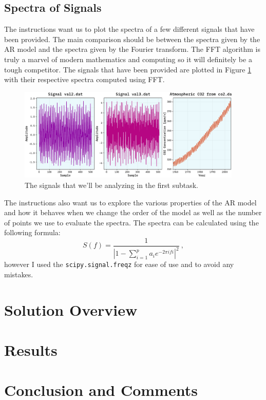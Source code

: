 \documentclass[10pt, titlepage, a4paper]{article}
\begin{document}
\subsection{Spectra of Signals}
The instructions want us to plot the spectra of a few different signals that have been provided. The main comparison 
should be between the spectra given by the AR model and the spectra given by the Fourier transform. The FFT algorithm 
is truly a marvel of modern mathematics and computing so it will definitely be a tough competitor. The signals that have 
been provided are plotted in Figure \ref{fig:signals} with their respective spectra computed using FFT.

\begin{figure}[H]
    \centering
    \includegraphics[width=0.95\textwidth]{../MaxEntropy/Images/supplied-data.pdf}
    \caption{The signals that we'll be analyzing in the first subtask.}
    \label{fig:signals}
\end{figure}

The instructions also want us to explore the various properties of the AR model and how it behaves when we change the
order of the model as well as the number of points we use to evaluate the spectra. The spectra can be calculated 
using the following formula:
%
\begin{equation}
    S(f) = \frac{1}{|1 - \sum_{i=1}^p a_i e^{-2\pi i f i}|^2}\>,
\end{equation}
%
however I used the \texttt{scipy.signal.freqz} for ease of use and to avoid any mistakes. 

\section{Solution Overview}
\section{Results}
\section{Conclusion and Comments}

% 
% 

\end{document}
